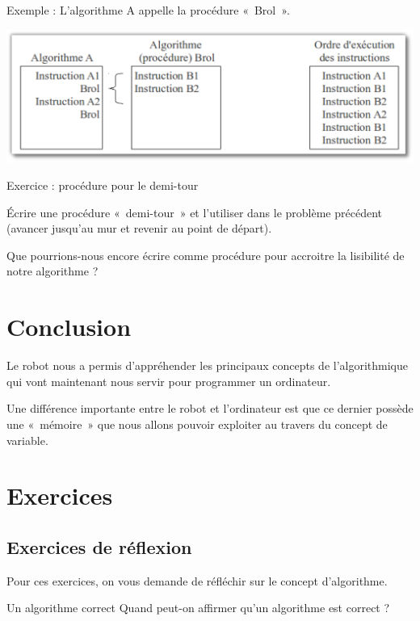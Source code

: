 	Exemple : L'algorithme A appelle la procédure «~Brol~».

	\begin{center}
	\includegraphics[width=\textwidth]{image/robot-procedure}
	\end{center}

	
	\begin{Emphase}[exercice]{Exercice : procédure pour le demi-tour}
	
		Écrire une procédure «~demi-tour~» et l'utiliser dans
		le problème précédent (avancer jusqu'au mur et revenir
		au point de départ).
		
		Que pourrions-nous encore écrire comme procédure pour accroitre
		la lisibilité de notre algorithme ?

	\end{Emphase}

\section{Conclusion}

	Le robot nous a permis d'appréhender les principaux
	concepts de l'algorithmique qui vont maintenant nous
	servir pour programmer un ordinateur. 
	
	Une différence importante entre le robot et
	l'ordinateur est que ce dernier possède une
	«~mémoire~» que nous allons pouvoir exploiter au travers du concept de
	variable.

\section{Exercices}

	\subsection{Exercices de réflexion}

		Pour ces exercices, on vous demande de réfléchir sur le concept
		d'algorithme.

\begin{Exercice}{Un algorithme correct}
Quand peut-on affirmer qu'un algorithme est correct ?
\end{Exercice}

